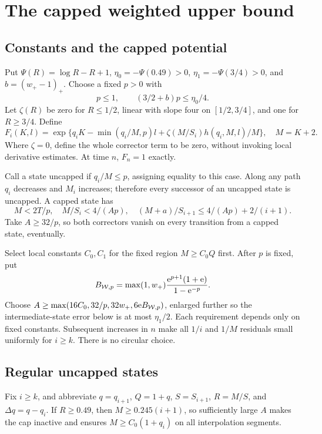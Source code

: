 \documentclass[11pt,a4paper]{article}
\theoremstyle{remark}\newtheorem{remark}[theorem]{Remark}
\numberwithin{equation}{section}
\begin{document}
\section{The capped weighted upper bound}\label{wasc:sh:sec:upper}
\subsection{Constants and the capped potential}
Put $\Psi(R)=\log R-R+1$, $\eta_0=-\Psi(0.49)>0$, $\eta_1=-\Psi(3/4)>0$, and $b=(w_+-1)_+$. Choose a fixed $p>0$ with
\[
p\le1,\qquad (3/2+b)p\le\eta_0/4.
\]
Let $\zeta(R)$ be zero for $R\le1/2$, linear with slope four on $[1/2,3/4]$, and one for $R\ge3/4$. Define
\begin{equation}\label{wasc:sh:eq:upperpotential}
F_i(K,l)=\exp\{q_iK-\min(q_i/M,p)l+\zeta(M/S_i)h(q_i,M,l)/M\},\quad M=K+2.
\end{equation}
Where $\zeta=0$, define the whole corrector term to be zero, without invoking local derivative estimates. At time $n$, $F_n=1$ exactly.

Call a state uncapped if $q_i/M\le p$, assigning equality to this case. Along any path $q_i$ decreases and $M_i$ increases; therefore every successor of an uncapped state is uncapped. A capped state has
\begin{equation}\label{wasc:sh:eq:capsupport}
M<2T/p,\quad M/S_i<4/(Ap),\quad
(M+a)/S_{i+1}\le4/(Ap)+2/(i+1).
\end{equation}
Take $A\ge32/p$, so both correctors vanish on every transition from a capped state, eventually.

Select local constants $C_0,C_1$ for the fixed region $M\ge C_0Q$ first. After $p$ is fixed, put
\[
B_{\mathcal W,p}=\max(1,w_+)\frac{\mathrm e^{p+1}(1+\mathrm e)}{1-\mathrm e^{-p}}.
\]
Choose $A\ge\max(16C_0,32/p,32w_+,6\mathrm e B_{\mathcal W,p})$, enlarged further so the intermediate-state error below is at most $\eta_1/2$. Each requirement depends only on fixed constants. Subsequent increases in $n$ make all $1/i$ and $1/M$ residuals small uniformly for $i\ge k$. There is no circular choice.

\subsection{Regular uncapped states}
Fix $i\ge k$, and abbreviate $q=q_{i+1}$, $Q=1+q$, $S=S_{i+1}$, $R=M/S$, and $\Delta q=q-q_i$. If $R\ge0.49$, then $M\ge0.245(i+1)$, so sufficiently large $A$ makes the cap inactive and ensures $M\ge C_0(1+q_i)$ on all interpolation segments.
\end{document}
